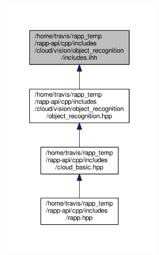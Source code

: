 \begin{figure}[H]
\begin{center}
\leavevmode
\includegraphics[width=232pt]{cloud_2vision_2object__recognition_2includes_8ihh__dep__incl}
\end{center}
\end{figure}
